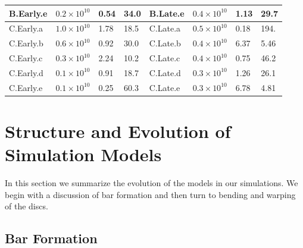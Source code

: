 \begin{table}
\begin{tabular}{|l l l l | l l l l|}
	B.Early.e & $0.2 \times 10^{10}$ & 0.54 & 34.0 & B.Late.e & $0.4 \times 10^{10}$ & 1.13 & 29.7 \\
	\hline
    C.Early.a & $1.0 \times 10^{10}$ & 1.78 & 18.5 & C.Late.a & $0.5 \times 10^{10}$ & 0.18 & 194. \\
	C.Early.b & $0.6 \times 10^{10}$ & 0.92 & 30.0 & C.Late.b & $0.4 \times 10^{10}$ & 6.37 & 5.46 \\
	C.Early.c & $0.3 \times 10^{10}$ & 2.24 & 10.2 & C.Late.c & $0.4 \times 10^{10}$ & 0.75 & 46.2 \\
	C.Early.d & $0.1 \times 10^{10}$ & 0.91 & 18.7 & C.Late.d & $0.3 \times 10^{10}$ & 1.26 & 26.1 \\
	C.Early.e & $0.1 \times 10^{10}$ & 0.25 & 60.3 & C.Late.e & $0.3 \times 10^{10}$ & 6.78 & 4.81 \\
	\hline
	\end{tabular}
\end{table}

\section{Structure and Evolution of Simulation Models} \label{sec:evolution}

In this section we summarize the evolution of the models in our
simulations.  We begin with a discussion of bar formation and then
turn to bending and warping of the discs.

\subsection{Bar Formation}

